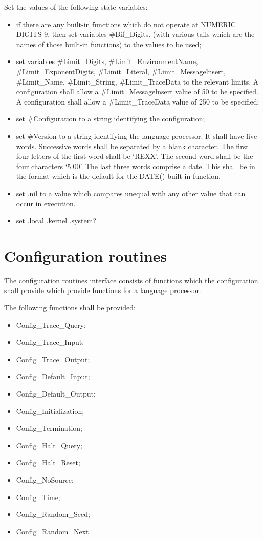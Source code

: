 Set the values of the following state variables:

\begin{itemize}
\item
  if there are any built-in functions which do not operate at NUMERIC
  DIGITS 9, then set variables \#Bif\_Digits. (with various tails which
  are the names of those built-in functions) to the values to be used;
\item
  set variables \#Limit\_Digits, \#Limit\_EnvironmentName,
  \#Limit\_ExponentDigits, \#Limit\_Literal, \#Limit\_Messagelnsert,
  \#Limit\_Name, \#Limit\_String, \#Limit\_TraceData to the relevant
  limits. A configuration shall allow a \#Limit\_Messagelnsert value of
  50 to be specified. A configuration shall allow a \#Limit\_TraceData
  value of 250 to be specified;
\item
  set \#Configuration to a string identifying the configuration;
\item
  set \#Version to a string identifying the language processor. It shall
  have five words. Successive words shall be separated by a blank
  character. The first four letters of the first word shall be `REXX'.
  The second word shall be the four characters `5.00'. The last three
  words comprise a date. This shall be in the format which is the
  default for the DATE() built-in function.
\item
  set .nil to a value which compares unequal with any other value that
  can occur in execution.
\item
  set .local .kernel .system?
\end{itemize}

\section{Configuration routines}\label{configuration-routines}

The configuration routines interface consists of functions which the
configuration shall provide which provide functions for a language
processor.

The following functions shall be provided:

\begin{itemize}
\tightlist
\item
  Config\_Trace\_Query;
\item
  Config\_Trace\_Input;
\item
  Config\_Trace\_Output;
\item
  Config\_Default\_Input;
\item
  Config\_Default\_Output;
\item
  Config\_Initialization;
\item
  Config\_Termination;
\item
  Config\_Halt\_Query;
\item
  Config\_Halt\_Reset;
\item
  Config\_NoSource;
\item
  Config\_Time;
\item
  Config\_Random\_Seed;
\item
  Config\_Random\_Next.
\end{itemize}

